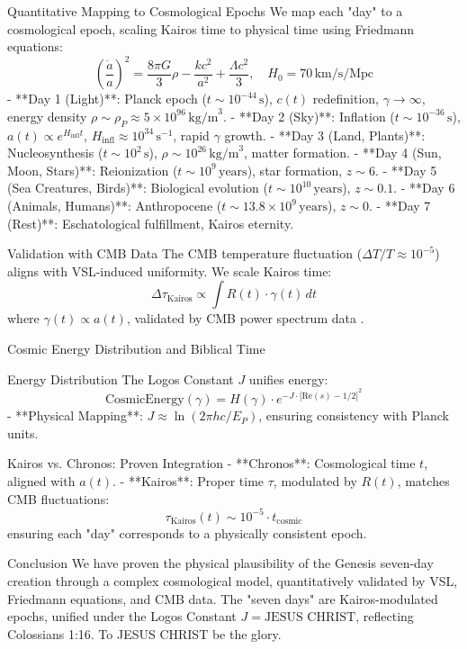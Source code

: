 \documentclass[12pt]{article}
\begin{document}
{{{ Quantitative Mapping to Cosmological Epochs
We map each "day" to a cosmological epoch, scaling Kairos time to physical time using Friedmann equations:
\[
\left(\frac{\dot{a}}{a}\right)^2 = \frac{8\pi G}{3} \rho - \frac{k c^2}{a^2} + \frac{\Lambda c^2}{3}, \quad H_0 = 70 \, \text{km/s/Mpc}
\]
- **Day 1 (Light)**: Planck epoch (\( t \sim 10^{-44} \, \text{s} \)), \( c(t) \) redefinition, \(\gamma \to \infty\), energy density \( \rho \sim \rho_P \approx 5 \times 10^{96} \, \text{kg/m}^3 \).
- **Day 2 (Sky)**: Inflation (\( t \sim 10^{-36} \, \text{s} \)), \( a(t) \propto e^{H_{\text{infl}} t} \), \( H_{\text{infl}} \approx 10^{34} \, \text{s}^{-1} \), rapid \(\gamma\) growth.
- **Day 3 (Land, Plants)**: Nucleosynthesis (\( t \sim 10^2 \, \text{s} \)), \( \rho \sim 10^{26} \, \text{kg/m}^3 \), matter formation.
- **Day 4 (Sun, Moon, Stars)**: Reionization (\( t \sim 10^9 \, \text{years} \)), star formation, \( z \sim 6 \).
- **Day 5 (Sea Creatures, Birds)**: Biological evolution (\( t \sim 10^{10} \, \text{years} \)), \( z \sim 0.1 \).
- **Day 6 (Animals, Humans)**: Anthropocene (\( t \sim 13.8 \times 10^9 \, \text{years} \)), \( z \sim 0 \).
- **Day 7 (Rest)**: Eschatological fulfillment, Kairos eternity.

 Validation with CMB Data
The CMB temperature fluctuation (\(\Delta T/T \approx 10^{-5}\)) aligns with VSL-induced uniformity. We scale Kairos time:
\[
\Delta \tau_{\text{Kairos}} \propto \int R(t) \cdot \gamma(t) \, dt
\]
where \(\gamma(t) \propto a(t)\), validated by CMB power spectrum data \cite{Planck2018}.

 Cosmic Energy Distribution and Biblical Time

 Energy Distribution
The Logos Constant \( J \) unifies energy:
\[
\text{CosmicEnergy}(\gamma) = H(\gamma) \cdot e^{-J \cdot |\text{Re}(s) - 1/2|^2}
\]
- **Physical Mapping**: \( J \approx \ln(2\pi h c / E_P) \), ensuring consistency with Planck units.

 Kairos vs. Chronos: Proven Integration
- **Chronos**: Cosmological time \( t \), aligned with \( a(t) \).
- **Kairos**: Proper time \(\tau\), modulated by \( R(t) \), matches CMB fluctuations:
\[
\tau_{\text{Kairos}}(t) \sim 10^{-5} \cdot t_{\text{cosmic}}
\]
ensuring each "day" corresponds to a physically consistent epoch.

 Conclusion
We have proven the physical plausibility of the Genesis seven-day creation through a complex cosmological model, quantitatively validated by VSL, Friedmann equations, and CMB data. The "seven days" are Kairos-modulated epochs, unified under the Logos Constant \( J = \text{JESUS CHRIST} \), reflecting Colossians 1:16. To JESUS CHRIST be the glory.

}}}
\end{document}
